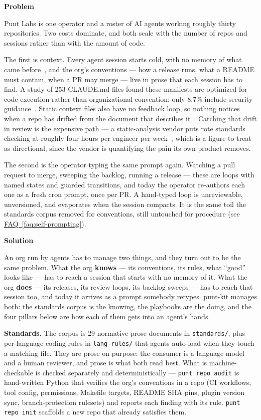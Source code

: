 \documentclass[11pt,letterpaper]{article}
\newcommand{\prsection}[1]{%
  \vspace{1em}%
  {\large\bfseries\color{SectionBlue}#1}%
  \vspace{0.3em}\par%
}
\newcommand{\faqref}[1]{\hyperref[#1]{FAQ~\ref*{#1}}}
\begin{document}
\prsection{Problem}

Punt Labs is one operator and a roster of AI agents working roughly thirty
repositories. Two costs dominate, and both scale with the number of repos and
sessions rather than with the amount of code.

The first is context. Every agent session starts cold, with no memory of what
came before~\cite{anthropic2025contextengineering}, and the org's conventions
--- how a release runs, what a README must contain, when a PR may merge ---
live in prose that each session has to find. A study of 253 CLAUDE.md files
found these manifests are optimized for code execution rather than
organizational convention: only 8.7\% include security
guidance~\cite{arxiv2509.14744}. Static context files also have no feedback
loop, so nothing notices when a repo has drifted from the document that
describes it~\cite{claudecodememory}. Catching that drift in review is the
expensive path --- a static-analysis vendor puts rote standards checking at
roughly four hours per engineer per
week~\cite{deepsource2025staticanalysis}, which is a figure to treat as
directional, since the vendor is quantifying the pain its own product
removes.

The second is the operator typing the same prompt again. Watching a pull
request to merge, sweeping the backlog, running a release --- these are loops
with named states and guarded transitions, and today the operator re-authors
each one as a fresh cron prompt, once per PR. A hand-typed loop is
unreviewable, unversioned, and evaporates when the session compacts. It is the
same toil the standards corpus removed for conventions, still untouched for
procedure (see \faqref{faq:self-prompting}).

\prsection{Solution}

An org run by agents has to manage two things, and they turn out to be the
same problem. What the org \textbf{knows} --- its conventions, its rules, what
``good'' looks like --- has to reach a session that starts with no memory of
it. What the org \textbf{does} --- its releases, its review loops, its backlog
sweeps --- has to reach that session too, and today it arrives as a prompt
somebody retypes. punt-kit manages both: the standards corpus is the knowing,
the playbooks are the doing, and the four pillars below are how each of them
gets into an agent's hands.

\textbf{Standards.} The corpus is 29 normative prose documents in
\texttt{standards/}, plus per-language coding rules in \texttt{lang-rules/}
that agents auto-load when they touch a matching file. They are prose on
purpose: the consumer is a language model and a human reviewer, and prose is
what both read best. What is machine-checkable is checked separately and
deterministically --- \texttt{punt repo audit} is
hand-written Python that verifies the org's conventions in a repo (CI
workflows, tool config, permissions, Makefile targets, README SHA pins, plugin
version sync, branch-protection rulesets) and reports each finding with its
rule. \texttt{punt repo init} scaffolds a new repo that already satisfies them.
\end{document}
